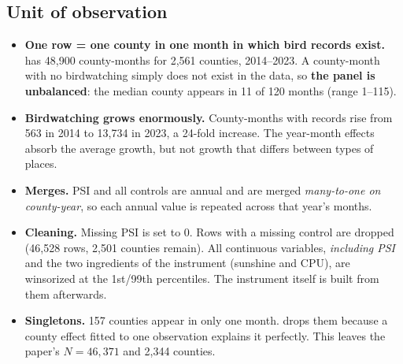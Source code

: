 \documentclass[11pt]{article}
\begin{document}
\subsection{Unit of observation}
\begin{itemize}
\item \textbf{One row = one county in one month in which bird records exist.}  has 48,900 county-months for 2,561 counties, 2014--2023. A county-month with no birdwatching simply does not exist in the data, so \textbf{the panel is unbalanced}: the median county appears in 11 of 120 months (range 1--115).
\item \textbf{Birdwatching grows enormously.} County-months with records rise from 563 in 2014 to 13,734 in 2023, a 24-fold increase. The year-month effects absorb the average growth, but not growth that differs between types of places.
\item \textbf{Merges.} PSI and all controls are annual and are merged \emph{many-to-one on county-year}, so each annual value is repeated across that year's months.
\item \textbf{Cleaning.} Missing PSI is set to 0. Rows with a missing control are dropped (46,528 rows, 2,501 counties remain). All continuous variables, \emph{including PSI} and the two ingredients of the instrument (sunshine and CPU), are winsorized at the 1st/99th percentiles. The instrument itself is built from them afterwards.
\item \textbf{Singletons.} 157 counties appear in only one month.  drops them because a county effect fitted to one observation explains it perfectly. This leaves the paper's $N=46{,}371$ and 2,344 counties.
\end{itemize}
\end{document}
